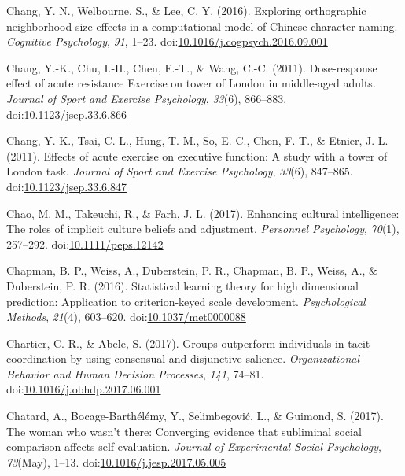 \documentclass[english,man]{apa6}
\begin{document}
\hypertarget{ref-Chang2016}{}
Chang, Y. N., Welbourne, S., \& Lee, C. Y. (2016). Exploring
orthographic neighborhood size effects in a computational model of
Chinese character naming. \emph{Cognitive Psychology}, \emph{91}, 1--23.
doi:\href{https://doi.org/10.1016/j.cogpsych.2016.09.001}{10.1016/j.cogpsych.2016.09.001}

\hypertarget{ref-Chang2011a}{}
Chang, Y.-K., Chu, I.-H., Chen, F.-T., \& Wang, C.-C. (2011).
Dose-response effect of acute resistance Exercise on tower of London in
middle-aged adults. \emph{Journal of Sport and Exercise Psychology},
\emph{33}(6), 866--883.
doi:\href{https://doi.org/10.1123/jsep.33.6.866}{10.1123/jsep.33.6.866}

\hypertarget{ref-Chang2011}{}
Chang, Y.-K., Tsai, C.-L., Hung, T.-M., So, E. C., Chen, F.-T., \&
Etnier, J. L. (2011). Effects of acute exercise on executive function: A
study with a tower of London task. \emph{Journal of Sport and Exercise
Psychology}, \emph{33}(6), 847--865.
doi:\href{https://doi.org/10.1123/jsep.33.6.847}{10.1123/jsep.33.6.847}

\hypertarget{ref-Chao2017}{}
Chao, M. M., Takeuchi, R., \& Farh, J. L. (2017). Enhancing cultural
intelligence: The roles of implicit culture beliefs and adjustment.
\emph{Personnel Psychology}, \emph{70}(1), 257--292.
doi:\href{https://doi.org/10.1111/peps.12142}{10.1111/peps.12142}

\hypertarget{ref-Chapman2016}{}
Chapman, B. P., Weiss, A., Duberstein, P. R., Chapman, B. P., Weiss, A.,
\& Duberstein, P. R. (2016). Statistical learning theory for high
dimensional prediction: Application to criterion-keyed scale
development. \emph{Psychological Methods}, \emph{21}(4), 603--620.
doi:\href{https://doi.org/10.1037/met0000088}{10.1037/met0000088}

\hypertarget{ref-Chartier2017}{}
Chartier, C. R., \& Abele, S. (2017). Groups outperform individuals in
tacit coordination by using consensual and disjunctive salience.
\emph{Organizational Behavior and Human Decision Processes}, \emph{141},
74--81.
doi:\href{https://doi.org/10.1016/j.obhdp.2017.06.001}{10.1016/j.obhdp.2017.06.001}

\hypertarget{ref-Chatard2017}{}
Chatard, A., Bocage-Barthélémy, Y., Selimbegović, L., \& Guimond, S.
(2017). The woman who wasn't there: Converging evidence that subliminal
social comparison affects self-evaluation. \emph{Journal of Experimental
Social Psychology}, \emph{73}(May), 1--13.
doi:\href{https://doi.org/10.1016/j.jesp.2017.05.005}{10.1016/j.jesp.2017.05.005}
\end{document}
